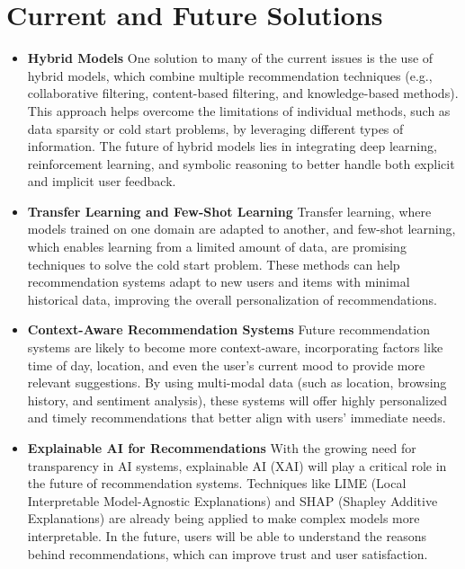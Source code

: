 \documentclass[10pt,twoside,slovak,a4paper]{article}
\begin{document}
\section{Current and Future Solutions} \label{Current and Future Solutions}

\begin{itemize}



\item \textbf{Hybrid Models} 
One solution to many of the current issues is the use of hybrid models, which combine multiple recommendation techniques (e.g., collaborative filtering, content-based filtering, and knowledge-based methods)\cite{future}. This approach helps overcome the limitations of individual methods, such as data sparsity or cold start problems, by leveraging different types of information\cite{multimodal}. The future of hybrid models lies in integrating deep learning, reinforcement learning, and symbolic reasoning to better handle both explicit and implicit user feedback.


\item \textbf{Transfer Learning and Few-Shot Learning}
Transfer learning, where models trained on one domain are adapted to another, and few-shot learning, which enables learning from a limited amount of data, are promising techniques to solve the cold start problem\cite{future}. These methods can help recommendation systems adapt to new users and items with minimal historical data, improving the overall personalization of recommendations.



\item \textbf{Context-Aware Recommendation Systems} 
Future recommendation systems are likely to become more context-aware, incorporating factors like time of day, location, and even the user's current mood to provide more relevant suggestions\cite{future}. By using multi-modal data (such as location, browsing history, and sentiment analysis), these systems will offer highly personalized and timely recommendations that better align with users' immediate needs.




\item \textbf{Explainable AI for Recommendations} 
With the growing need for transparency in AI systems, explainable AI (XAI) will play a critical role in the future of recommendation systems\cite{XAI}. Techniques like LIME (Local Interpretable Model-Agnostic Explanations) and SHAP (Shapley Additive Explanations) are already being applied to make complex models more interpretable. In the future, users will be able to understand the reasons behind recommendations, which can improve trust and user satisfaction.




\end{itemize}
\end{document}
